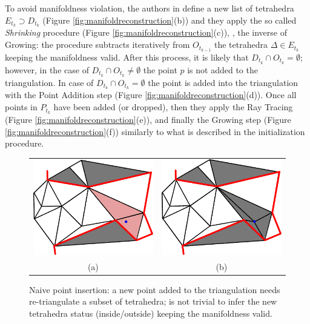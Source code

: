 To avoid manifoldness violation, the authors in \cite{litvinov_lhuillier_13} define a new list of tetrahedra $E_{t_k} \supset D_{t_k}$ (Figure \ref{fig:manifoldreconstruction}(b)) and they apply the so called \emph{Shrinking} procedure (Figure \ref{fig:manifoldreconstruction}(c)), \ie, the inverse of Growing: the procedure subtracts iteratively from $O_{t_{k-1}}$ the tetrahedra  $\Delta \in E_{t_k}$ keeping the manifoldness valid.
After this process, it is likely that $D_{t_k} \cap O_{t_k} = \emptyset$; however, in the case of $D_{t_k} \cap O_{t_k} \neq \emptyset$ the point $p$ is not added to the triangulation.
In case of $D_{t_k} \cap O_{t_k} = \emptyset$ the point is added into the triangulation with the Point Addition step (Figure \ref{fig:manifoldreconstruction}(d)). 
Once all points in $P_{t_k}$ have been added (or dropped), then they apply the Ray Tracing  (Figure \ref{fig:manifoldreconstruction}(e)), and finally the Growing step (Figure \ref{fig:manifoldreconstruction}(f)) similarly to what is described in the initialization procedure.


\begin{figure}[tp]
\centering
 \begin{tabular}{cc}
  \includegraphics[width=0.4\columnwidth]{./img/ch_soa/pointIns01}&
  \includegraphics[width=0.4\columnwidth]{./img/ch_soa/pointIns02}\\
  (a)&(b)
 \end{tabular}
 \caption{Naive point insertion: a new point added to the triangulation needs re-triangulate a subset of tetrahedra; is not trivial to infer the new tetrahedra status (inside/outside) keeping the manifoldness valid.}
 \label{fig:insertion}
\end{figure}



